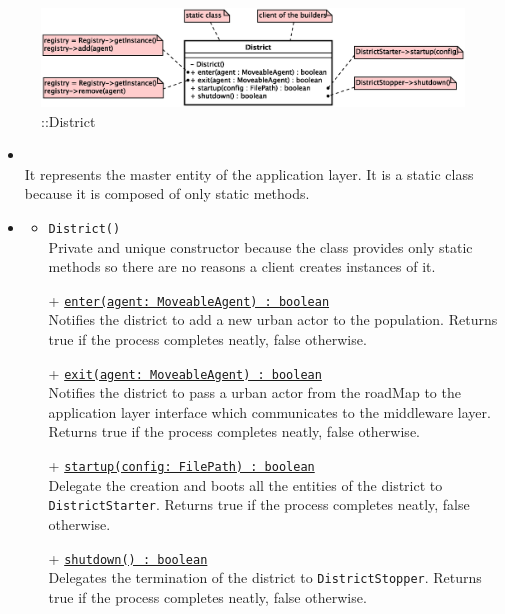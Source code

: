 \begin{figure}[h]
\centering
\includegraphics[scale=0.6,keepaspectratio]{images/solution/app/backend/district.eps}
\caption{\pReactive::District}
\label{fig:sd-app-district}
\end{figure}
\FloatBarrier
\begin{itemize}
  \item \textbf{\descr} \\
  It represents the master entity of the application layer.
  It is a static class because it is composed of only static methods.
  \item \textbf{\ops}
  \begin{itemize}
    \item \texttt{District()} \\
    Private and unique constructor because the class provides only static methods 
    so there are no reasons a client creates instances of it.
    \item[+] \texttt{\underline{enter(agent: MoveableAgent) : boolean}} \\
    Notifies the district to add a new urban actor to the population.
    Returns true if the process completes neatly, false otherwise.
    \item[+] \texttt{\underline{exit(agent: MoveableAgent) : boolean}} \\
    Notifies the district to pass a urban actor from the roadMap to the 
    application layer interface which communicates to the middleware layer.
    Returns true if the process completes neatly, false otherwise.
    \item[+] \texttt{\underline{startup(config: FilePath) : boolean}} \\
    Delegate the creation and boots all the entities of the district
    to \texttt{DistrictStarter}.
    Returns true if the process completes neatly, false otherwise.
    \item[+] \texttt{\underline{shutdown() : boolean}} \\
    Delegates the termination of the district
    to \texttt{DistrictStopper}.
    Returns true if the process completes neatly, false otherwise.
  \end{itemize}
\end{itemize} 
